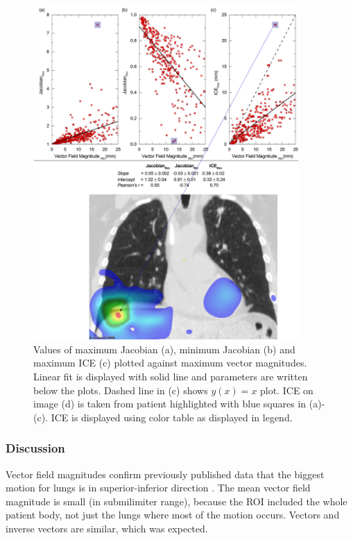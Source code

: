 \documentclass[type=dr, dr=rernat, accentcolor=tud7b,colorbacktitle, bigchapter, openright, twoside, 12pt ]{tudthesis}
\begin{document}
\begin{figure}[H]
	\begin{center}		
		\includegraphics[width=0.9\textwidth]{./Images/maxVf_lung.png}
		\caption{Values of maximum Jacobian (a), minimum Jacobian (b) and maximum ICE (c) plotted against maximum vector magnitudes. Linear fit is displayed with solid line and parameters are written below the plots. Dashed line in (c) shows $y(x)= x$ plot. ICE on image (d) is taken from patient highlighted with blue squares in (a)-(c).
			ICE is displayed using color table as displayed in legend.}
		\label{maxvf}
	\end{center}
\end{figure}

\newpage

\subsubsection{Discussion}

Vector field magnitudes confirm previously published data that the biggest motion for lungs is in superior-inferior direction \cite{Seppenwoolde2002, Britton2007, Liu2007}. The mean vector field magnitude is small (in submilimiter range), 
because the ROI included the whole patient body, not just the lungs where most of the motion occurs. Vectors and inverse vectors are similar, which was expected.
\end{document}
